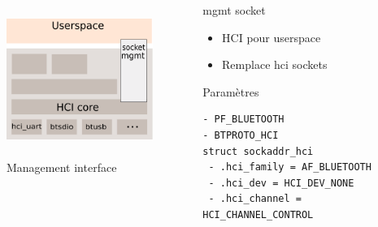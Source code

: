 \begin{frame}[fragile]
	\begin{columns}[t]
\begin{column}{0.60\linewidth}
	\begin{figure}
		\includegraphics[height=5cm]{img/bluez_kernel_hci_sock.png}
		\caption{Management interface}
	\end{figure}
\end{column}
\begin{column}{0.40\linewidth}
	\begin{block}{mgmt socket}
		\begin{itemize}
			\item HCI pour userspace
			\item Remplace hci sockets
		\end{itemize}
	\end{block}
	\begin{block}{Paramètres}
		\begin{Verbatim}[fontsize=\tiny]
- PF_BLUETOOTH
- BTPROTO_HCI
struct sockaddr_hci
 - .hci_family = AF_BLUETOOTH
 - .hci_dev = HCI_DEV_NONE
 - .hci_channel = HCI_CHANNEL_CONTROL
		\end{Verbatim}
	\end{block}
\end{column}
\end{columns}
\end{frame}

